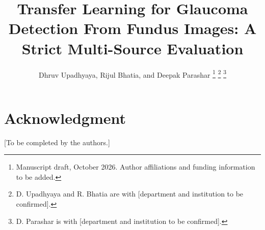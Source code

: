 \documentclass[journal,twoside,web]{ieeecolor}
\begin{document}
\title{Transfer Learning for Glaucoma Detection From Fundus Images: A Strict Multi-Source Evaluation}
\author{Dhruv Upadhyaya, Rijul Bhatia, and Deepak Parashar
\thanks{%
Manuscript draft, October 2026. Author affiliations and funding information to be added.}
\thanks{D. Upadhyaya and R. Bhatia are with [department and institution to be confirmed].}
\thanks{D. Parashar is with [department and institution to be confirmed].}}

\maketitle



\section*{Acknowledgment}
[To be completed by the authors.]
\end{document}
